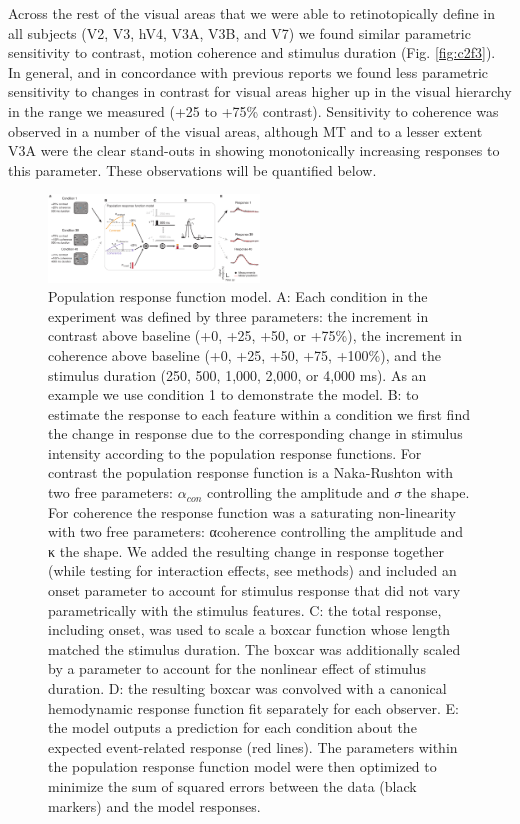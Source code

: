 Across the rest of the visual areas that we were able to retinotopically define in all subjects (V2, V3, hV4, V3A, V3B, and V7) we found similar parametric sensitivity to contrast, motion coherence and stimulus duration (Fig. \ref{fig:c2f3}). In general, and in concordance with previous reports \citep{Avidan2002-jg} we found less parametric sensitivity to changes in contrast for visual areas higher up in the visual hierarchy in the range we measured (+25 to +75\% contrast). Sensitivity to coherence was observed in a number of the visual areas, although MT and to a lesser extent V3A were the clear stand-outs in showing monotonically increasing responses to this parameter. These observations will be quantified below.

\begin{figure}
\centering
\includegraphics[keepaspectratio,width=0.5\textwidth]{figs_c2/Fig4_model.pdf}
\caption[Population response function model]{Population response function model. A: Each condition in the experiment was defined by three parameters: the increment in contrast above baseline (+0, +25, +50, or +75\%), the increment in coherence above baseline (+0, +25, +50, +75, +100\%), and the stimulus duration (250, 500, 1,000, 2,000, or 4,000 ms). As an example we use condition 1 to demonstrate the model. B: to estimate the response to each feature within a condition we first find the change in response due to the corresponding change in stimulus intensity according to the population response functions. For contrast the population response function is a Naka-Rushton with two free parameters: $\alpha_{con}$ controlling the amplitude and $\sigma$ the shape. For coherence the response function was a saturating non-linearity with two free parameters: αcoherence controlling the amplitude and κ the shape. We added the resulting change in response together (while testing for interaction effects, see methods) and included an onset parameter to account for stimulus response that did not vary parametrically with the stimulus features. C: the total response, including onset, was used to scale a boxcar function whose length matched the stimulus duration. The boxcar was additionally scaled by a parameter to account for the nonlinear effect of stimulus duration. D: the resulting boxcar was convolved with a canonical hemodynamic response function fit separately for each observer. E: the model outputs a prediction for each condition about the expected event-related response (red lines). The parameters within the population response function model were then optimized to minimize the sum of squared errors between the data (black markers) and the model responses.}
\label{fig:c2f4}
\end{figure}

